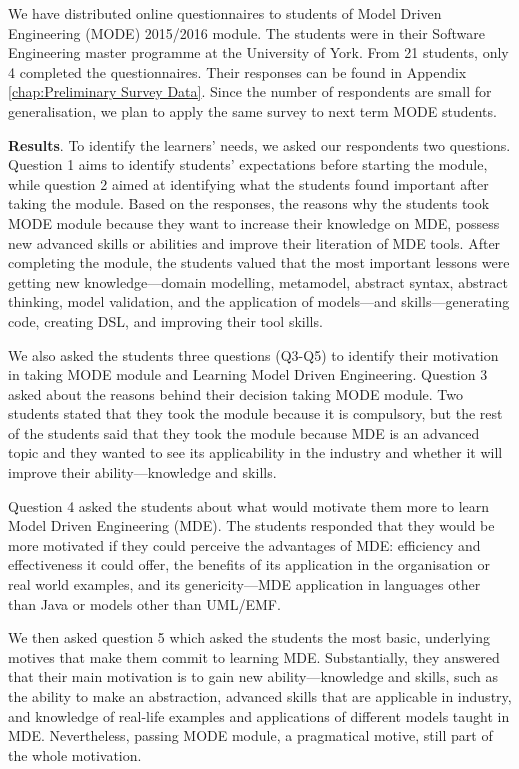 \documentclass[12pt, a4paper]{report} \usepackage[titletoc]{appendix}
\begin{document}
We have distributed online questionnaires to students of Model Driven
Engineering (MODE) 2015/2016 module. The students were in their Software
Engineering master programme at the University of York. From 21 students, only 4
completed the questionnaires. Their responses can be found in Appendix
\autoref{chap:Preliminary Survey Data}.  Since the number of respondents are
small for generalisation, we plan to apply the same survey to next term MODE
students.

\textbf{Results}. To identify the learners' needs, we asked our respondents two questions. Question 1 aims to identify students' expectations before starting the module, while question 2 aimed at identifying what the students found important after taking the module. Based on the responses, the reasons why the students took MODE module because they want to increase their knowledge on MDE, possess new advanced skills or abilities and improve their literation of MDE tools. After completing the module, the students valued that the most important lessons were getting new knowledge---domain modelling, metamodel, abstract syntax, abstract thinking, model validation, and the application of models---and skills---generating code, creating DSL, and improving their tool skills. 

We also asked the students three questions (Q3-Q5) to identify their motivation
in taking MODE module and Learning Model Driven Engineering. Question 3 asked
about the reasons behind their decision taking MODE module. Two students stated
that they took the module because it is compulsory, but the rest of the students
said that they took the module because MDE is an advanced topic and they wanted
to see its applicability in the industry and whether it will improve their
ability---knowledge and skills.

Question 4 asked the students about what would motivate them more to learn Model
Driven Engineering (MDE). The students responded that they would be more
motivated if they could perceive the advantages of MDE: efficiency and
effectiveness it could offer, the benefits of its application in the
organisation or real world examples, and its genericity---MDE application in
languages other than Java or models other than UML/EMF.

We then asked question 5 which asked the students the most basic, underlying motives that make them commit to learning MDE. Substantially, they answered that their main motivation is to gain new ability---knowledge and skills, such as the ability to make an abstraction, advanced skills that are applicable in industry, and knowledge of real-life examples and applications of different models taught in MDE. Nevertheless, passing MODE module, a pragmatical motive, still part of the whole motivation. 
\end{document}
